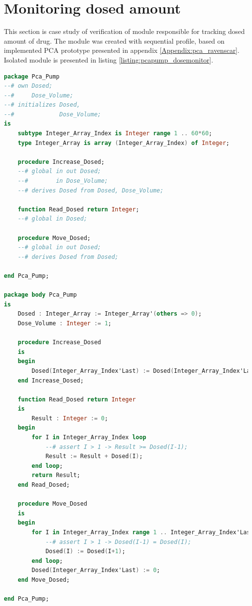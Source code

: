 \section{Monitoring dosed amount}
\label{verification:pcapump:monitoring}

This section is case study of verification of module responsible for tracking dosed amount of drug. The module was created with sequential profile, based on implemented PCA prototype presented in appendix \ref{Appendix:pca_ravenscar}. Isolated module is presented in listing \ref{listing:pcapump_dosemonitor}.

\singlespacing
\begin{lstlisting}[language=ada, frame=single, gobble=0, caption={Dose monitor module specification}, label={listing:pcapump_dosemonitor}]
package Pca_Pump
--# own Dosed;
--#     Dose_Volume;
--# initializes Dosed,
--#             Dose_Volume;
is
    subtype Integer_Array_Index is Integer range 1 .. 60*60;
    type Integer_Array is array (Integer_Array_Index) of Integer;

    procedure Increase_Dosed;
    --# global in out Dosed;
    --#        in Dose_Volume;
    --# derives Dosed from Dosed, Dose_Volume;

    function Read_Dosed return Integer;
    --# global in Dosed;

    procedure Move_Dosed;
    --# global in out Dosed;
    --# derives Dosed from Dosed;

end Pca_Pump;

package body Pca_Pump
is
    Dosed : Integer_Array := Integer_Array'(others => 0);
    Dose_Volume : Integer := 1;

    procedure Increase_Dosed
    is
    begin
        Dosed(Integer_Array_Index'Last) := Dosed(Integer_Array_Index'Last) + Dose_Volume;
    end Increase_Dosed;

    function Read_Dosed return Integer
    is
        Result : Integer := 0;
    begin
        for I in Integer_Array_Index loop
            --# assert I > 1 -> Result >= Dosed(I-1);
            Result := Result + Dosed(I);
        end loop;
        return Result;
    end Read_Dosed;

    procedure Move_Dosed
    is
    begin
        for I in Integer_Array_Index range 1 .. Integer_Array_Index'Last-1 loop
            --# assert I > 1 -> Dosed(I-1) = Dosed(I);
            Dosed(I) := Dosed(I+1);
        end loop;
        Dosed(Integer_Array_Index'Last) := 0;
    end Move_Dosed;

end Pca_Pump;
\end{lstlisting}
\doublespacing

